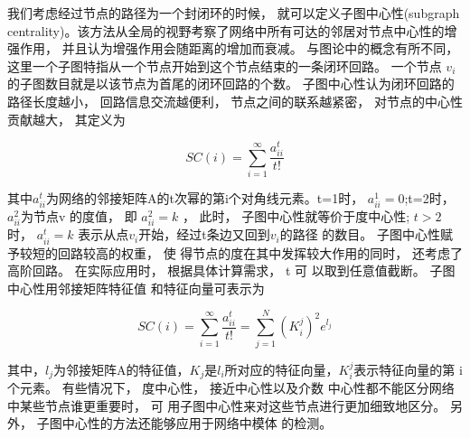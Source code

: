 我们考虑经过节点的路径为一个封闭环的时候， 就可以定义子图中心性(subgraph centrality)\parencite{Estrada2005Subgraph}。该方法从全局的视野考察了网络中所有可达的邻居对节点中心性的增强作用， 并且认为增强作用会随距离的增加而衰减。 与图论中的概念有所不同， 这里一个子图特指从一个节点开始到这个节点结束的一条闭环回路。 一个节点 $v_i$ 的子图数目就是以该节点为首尾的闭环回路的个数。 子图中心性认为闭环回路的路径长度越小， 回路信息交流越便利， 节点之间的联系越紧密， 对节点的中心性贡献越大， 其定义为

\[SC(i) = \sum\limits_{i = 1}^\infty  {\frac{{a_{ii}^t}}{{t!}}} \]

				其中$a_{ii}^t$为网络的邻接矩阵A的t次幂的第i个对角线元素。t=1时， $a_{ii}^1=0$;t=2时， $a_{ii}^2$为节点v 的度值， 即 $a_{ii}^2=k$ ， 此时， 子图中心性就等价于度中心性; $t>2$ 时， $a_{ii}^t=k$ 表示从点$v_i$开始，经过t条边又回到$v_i$的路径 的数目。 子图中心性赋予较短的回路较高的权重， 使 得节点的度在其中发挥较大作用的同时， 还考虑了 高阶回路。 在实际应用时， 根据具体计算需求， t 可 以取到任意值截断。 子图中心性用邻接矩阵特征值 和特征向量可表示为

\[SC(i) = \sum\limits_{i = 1}^\infty  {\frac{{a_{ii}^t}}{{t!}}}  = \sum\limits_{j = 1}^N {{{(K_i^j)}^2}} {e^{{l_j}}}\]

				其中，$l_j$为邻接矩阵A的特征值，$K_j$是$l_i$所对应的特征向量，$K_i^j$表示特征向量的第 i 个元素。 有些情况下， 度中心性， 接近中心性以及介数 中心性都不能区分网络中某些节点谁更重要时， 可 用子图中心性来对这些节点进行更加细致地区分\parencite{Estrada2005Subgraph}。 另外， 子图中心性的方法还能够应用于网络中模体 的检测\parencite{Estrada2005Subgraph}。



